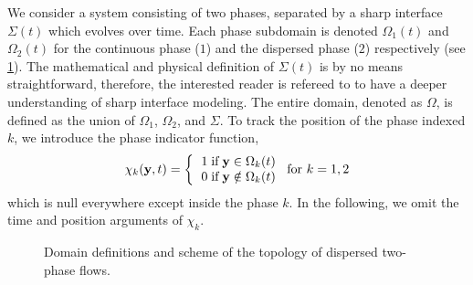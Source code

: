 We consider a system consisting of two phases, separated by a sharp interface $\Sigma(t)$ which evolves over time. 
Each phase subdomain is denoted $\Omega_1(t)$ and $\Omega_2(t)$ for the continuous phase ($1$) and the dispersed phase ($2$) respectively (see \ref{fig:Scheme}). 
The mathematical and physical definition of $\Sigma(t)$ is by no means straightforward, therefore, the interested reader is refereed to \cite{bothe2022sharp} to have a deeper understanding of sharp interface modeling. 
The entire domain, denoted as $\Omega$, is defined as the union of $\Omega_1$, $\Omega_2$, and $\Sigma$.
To track the position of the phase indexed $k$, we introduce the phase indicator function, 
\begin{equation}
    \chi_k(\textbf{y},t) =  \left\{
      \begin{tabular}{cc}
        $1 \;\text{if} \;\textbf{y} \in \Omega_k(t)$\\
        $0 \;\text{if} \;\textbf{y} \notin \Omega_k(t)$
      \end{tabular}
      \right.
      \text{for $k = 1,2$}
      \label{eq:PIF}
\end{equation}
which is null everywhere except inside the phase $k$. 
In the following, we omit the time and position arguments of $\chi_k$. 
\begin{figure}[h!]
    \centering
    \caption{Domain definitions and scheme of the topology of dispersed two-phase flows.}
    \label{fig:Scheme}
\end{figure}

